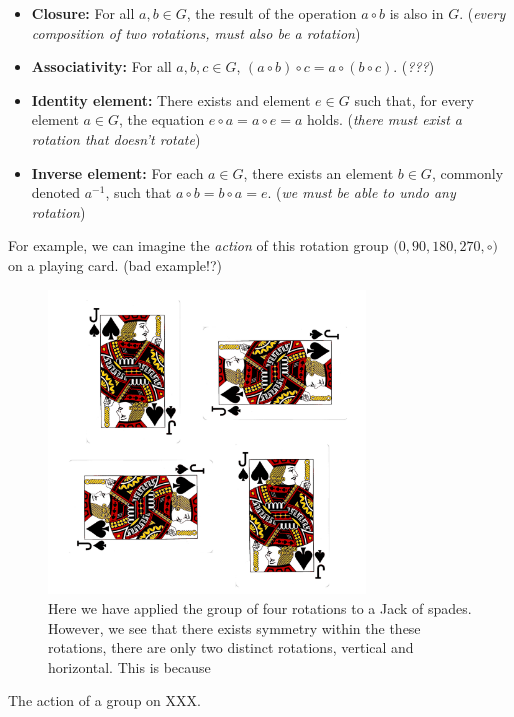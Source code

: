 \begin{itemize}
	\tightlist
	\item \textbf{Closure:} For all $a, b \in G$, the result of the operation $a \circ b$ is also in $G$. (\textit{every composition of two rotations, must also be a rotation})
	\item \textbf{Associativity:} For all $a,b,c \in G$, $(a\circ b) \circ c = a\circ (b\circ c)$. (\textit{???})
	\item \textbf{Identity element:} There exists and element $e\in G$ such that, for every element $a\in G$, the equation $e\circ a = a\circ e = a$ holds. (\textit{there must exist a rotation that doesn't rotate})
	\item \textbf{Inverse element:} For each $a \in G$, there exists an element $b \in G$, commonly denoted $a^{−1}$, such that $a \circ b = b \circ a = e$. (\textit{we must be able to undo any rotation})
\end{itemize}

For example, we can imagine the \textit{action} of this rotation group $\big(0, 90, 180, 270, \circ \big)$ on a playing card. (bad example!?)

\begin{figure}[h!]
	\centering
	\includegraphics[width=0.75\textwidth,height=0.5\textheight]{../../pictures/images/jacks.png}
	\caption{Here we have applied the group of four rotations to a Jack of spades.
	However, we see that there exists symmetry within the these rotations,
	there are only two distinct rotations, vertical and horizontal. This is because }
\end{figure}

The action of a group on XXX.

